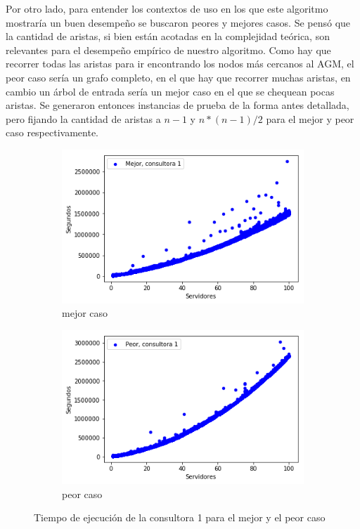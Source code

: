 \documentclass[A4paper,oneside,fleqn,11pt]{article}
\theoremstyle{definition}
\begin{document}
Por otro lado, para entender los contextos de uso en los que este algoritmo mostraría un buen desempeño se buscaron peores y mejores casos. Se pensó que la cantidad de aristas, si bien están acotadas en la complejidad teórica, son relevantes para el desempeño empírico de nuestro algoritmo. Como hay que recorrer todas las aristas para ir encontrando los nodos más cercanos al AGM, el peor caso sería un grafo completo, en el que hay que recorrer muchas aristas, en cambio un árbol de entrada sería un mejor caso en el que se chequean pocas aristas. Se generaron entonces instancias de prueba de la forma antes detallada, pero fijando la cantidad de aristas a $n-1$ y $n*(n-1)/2$ para el mejor y peor caso respectivamente.

\begin{figure}[H] %
    \begin{subfigure}[b]{0.45\textwidth}
        \includegraphics[width=\textwidth]{graficosEj2/m1}
        \caption[center]{mejor caso}
        \label{ni se pa que sirve esto}
    \end{subfigure}
    \begin{subfigure}[b]{0.45\textwidth}
        \includegraphics[width=\textwidth]{graficosEj2/p1}
        \caption{peor caso}
        \label{ni se pa que sirve esto}
    \end{subfigure}
    \caption{Tiempo de ejecución de la consultora 1 para el mejor y el peor caso}
\end{figure}
\end{document}
